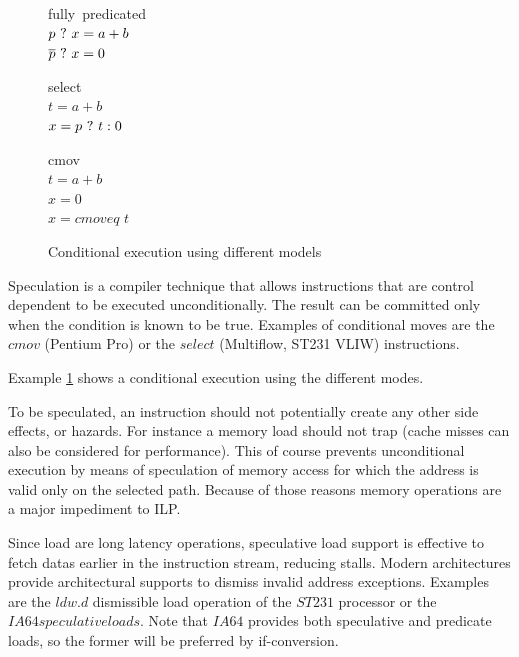 \begin{figure}
\footnotesize
\begin{minipage}[t]{3cm}
\mbox{fully predicated} \\
$p ~?~ x = a + b $ \\
$\overline{p} ~?~ x = 0 $ \\
\end{minipage} 
\begin{minipage}[t]{3cm}
\mbox{select} \\
$t = a + b $ \\
$x= p ~?~ t : 0 $ \\
\end{minipage}
\begin{minipage}[t]{3cm}
\mbox{cmov} \\
$t = a + b $ \\
$x = 0 $ \\
$x = cmoveq$ $t$ \\
\end{minipage}
\caption{Conditional execution using different models}
\label{fig:pred}
\end{figure}

Speculation is a compiler technique that allows instructions that are control dependent to be executed unconditionally. The result can be committed only when the condition is known to be true. Examples of conditional moves are the $cmov$ (Pentium Pro) or the $select$ (Multiflow, ST231 VLIW) instructions.

Example \ref{fig:pred} shows a conditional execution using the different modes.

To be speculated, an instruction should not potentially create any other side effects, or hazards. For instance a memory load should not trap (cache misses can also be considered for performance). This of course prevents unconditional execution by means of speculation of memory access for which the address is valid only on the selected path. Because of those reasons memory operations are a major impediment to ILP. 

Since load are long latency operations, speculative load support is effective to fetch datas earlier in the instruction stream, reducing stalls. Modern architectures provide architectural supports to dismiss invalid address exceptions. Examples are the $ldw.d$ dismissible load operation of the $ST231$ processor or the $IA64 speculative loads$. Note that $IA64$ provides both speculative and predicate loads, so the former will be preferred by if-conversion. 

